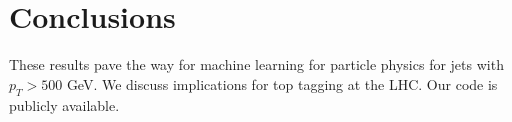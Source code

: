 \section{Conclusions}\label{sec:conclusions}

These results pave the way for machine learning for particle physics for
jets with $p_T > 500$ GeV. We discuss implications for top tagging at
the LHC. Our code is publicly available.

